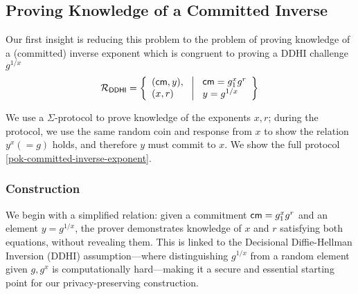\subsection{Proving Knowledge of a Committed Inverse}
Our first insight is reducing this problem to the problem of proving knowledge of a (committed) inverse exponent which is congruent to proving a DDHI challenge $g^{1/x}$
\[
\mathcal{R}_{\mathsf{DDHI}} = \left\{ 
\begin{array}{l} (\mathsf{cm}, y),\\
(x, r) 
\end{array}
\ \middle|
\ \begin{array}{l}
\mathsf{cm} = g_1^{x} g^r \\
y = g^{1/x} \\
\end{array} \right\}
\]

We use a $\Sigma$-protocol to prove knowledge of the exponents $x, r$; during the protocol, we use the same random coin and response from $x$ to show the relation $y^x (=g)$ holds, and therefore $y$ must commit to $x$. We show the full protocol \ref{pok-committed-inverse-exponent}. 




\subsubsection{Construction}

We begin with a simplified relation: given a commitment $\mathsf{cm} = g_1^x g^r$ and an element $y = g^{1/x}$, the prover demonstrates knowledge of $x$ and $r$ satisfying both equations, without revealing them. This is linked to the Decisional Diffie-Hellman Inversion (DDHI) assumption—where distinguishing $g^{1/x}$ from a random element given $g, g^x$ is computationally hard—making it a secure and essential starting point for our privacy-preserving construction.


